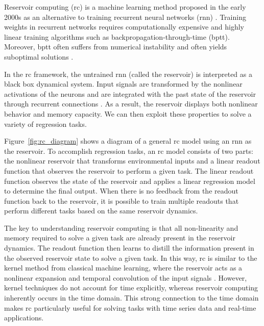 Reservoir computing (\acrshort{rc}) is a machine learning method proposed in the early 2000s as an alternative to training recurrent neural networks (\acrshort{rnn}) \citep{jaeger_echo_2002}. 
Training weights in recurrent networks requires computationally expensive and highly linear training algorithms such as backpropagation-through-time (\acrshort{bptt}). 
Moreover, \acrshort{bptt} often suffers from numerical instability and often yields suboptimal solutions \citep{bengio_learning_1994}.

In the \acrshort{rc} framework, the untrained \acrshort{rnn} (called the reservoir) is interpreted as a black box dynamical system.
Input signals are transformed by the nonlinear activations of the neurons and are integrated with the past state of the reservoir through recurrent connections \citep{jaeger_harnessing_2004}.
As a result, the reservoir displays both nonlinear behavior and memory capacity.
We can then exploit these properties to solve a variety of regression tasks.


\mbox{Figure \ref{fig:rc_diagram}} shows a diagram of a general \acrshort{rc} model using an \acrshort{rnn} as the reservoir.
To accomplish regression tasks, an \acrshort{rc} model consists of two parts: the nonlinear reservoir that transforms environmental inputs and a linear readout function that observes the reservoir to perform a given task. 
The linear readout function observes the state of the reservoir and applies a linear regression model to determine the final output. 
When there is no feedback from the readout function back to the reservoir, it is possible to train multiple readouts that perform different tasks based on the same reservoir dynamics.




The key to understanding reservoir computing is that all non-linearity and memory required to solve a given task are already present in the reservoir dynamics. 
The readout function then learns to distill the information present in the observed reservoir state to solve a given task. 
In this way, \acrshort{rc} is similar to the kernel method from classical machine learning, where the reservoir acts as a nonlinear expansion and temporal convolution of the input signals \citep{hermans_recurrent_2012}. 
However, kernel techniques do not account for time explicitly, whereas reservoir computing inherently occurs in the time domain. 
This strong connection to the time domain makes \acrshort{rc} particularly useful for solving tasks with time series data and real-time applications.


